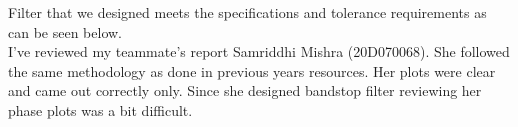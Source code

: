 \documentclass{scrartcl}
\begin{document}
Filter that we designed meets the specifications and tolerance requirements as can be seen below.\\

I've reviewed my teammate's report Samriddhi Mishra (20D070068). She followed the same methodology as done in previous years resources. Her plots were clear and came out correctly only. Since she designed bandstop filter reviewing her phase plots was a bit difficult.
\end{document}
